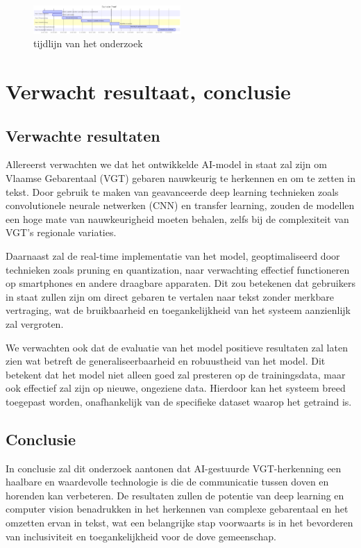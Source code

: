 \begin{figure}[h!]
  \includegraphics[width=0.5\textwidth]{../graphics/gantt_tijd.png}
  \caption{tijdlijn van het onderzoek}
  \label{fig:gantt_tijd}
\end{figure}

\section{Verwacht resultaat, conclusie}%
\label{sec:verwachte_resultaten}
\subsection{Verwachte resultaten} Allereerst verwachten we dat het ontwikkelde AI-model in staat zal zijn om Vlaamse Gebarentaal (VGT) gebaren nauwkeurig te herkennen en om te zetten in tekst. Door gebruik te maken van geavanceerde deep learning technieken zoals convolutionele neurale netwerken (CNN) en transfer learning, zouden de modellen een hoge mate van nauwkeurigheid moeten behalen, zelfs bij de complexiteit van VGT's regionale variaties.

Daarnaast zal de real-time implementatie van het model, geoptimaliseerd door technieken zoals pruning en quantization, naar verwachting effectief functioneren op smartphones en andere draagbare apparaten. Dit zou betekenen dat gebruikers in staat zullen zijn om direct gebaren te vertalen naar tekst zonder merkbare vertraging, wat de bruikbaarheid en toegankelijkheid van het systeem aanzienlijk zal vergroten.

We verwachten ook dat de evaluatie van het model positieve resultaten zal laten zien wat betreft de generaliseerbaarheid en robuustheid van het model. Dit betekent dat het model niet alleen goed zal presteren op de trainingsdata, maar ook effectief zal zijn op nieuwe, ongeziene data. Hierdoor kan het systeem breed toegepast worden, onafhankelijk van de specifieke dataset waarop het getraind is.

\subsection{Conclusie} In conclusie zal dit onderzoek aantonen dat AI-gestuurde VGT-herkenning een haalbare en waardevolle technologie is die de communicatie tussen doven en horenden kan verbeteren. De resultaten zullen de potentie van deep learning en computer vision benadrukken in het herkennen van complexe gebarentaal en het omzetten ervan in tekst, wat een belangrijke stap voorwaarts is in het bevorderen van inclusiviteit en toegankelijkheid voor de dove gemeenschap.

